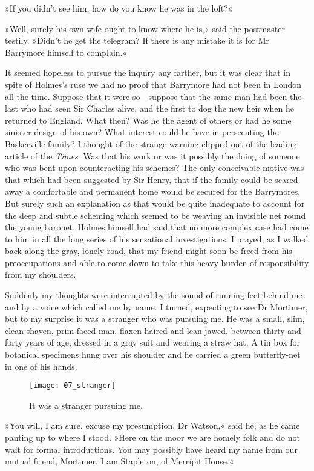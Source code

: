 »If you didn't see him, how do you know he was in the loft?«

»Well, surely his own wife ought to know where he is,« said the postmaster testily. »Didn't he get the telegram? If there is any mistake it is for Mr Barrymore himself to complain.«

It seemed hopeless to pursue the inquiry any farther, but it was clear that in spite of Holmes's ruse we had no proof that Barrymore had not been in London all the time. Suppose that it were so\allowbreak\allowbreak---\allowbreak \allowbreak suppose that the same man had been the last who had seen Sir Charles alive, and the first to dog the new heir when he returned to England. What then? Was he the agent of others or had he some sinister design of his own? What interest could he have in persecuting the Baskerville family? I thought of the strange warning clipped out of the leading article of the \textit{Times}. Was that his work or was it possibly the doing of someone who was bent upon counteracting his schemes? The only conceivable motive was that which had been suggested by Sir Henry, that if the family could be scared away a comfortable and permanent home would be secured for the Barrymores. But surely such an explanation as that would be quite inadequate to account for the deep and subtle scheming which seemed to be weaving an invisible net round the young baronet. Holmes himself had said that no more complex case had come to him in all the long series of his sensational investigations. I prayed, as I walked back along the gray, lonely road, that my friend might soon be freed from his preoccupations and able to come down to take this heavy burden of responsibility from my shoulders.

Suddenly my thoughts were interrupted by the sound of running feet behind me and by a voice which called me by name. I turned, expecting to see Dr Mortimer, but to my surprise it was a stranger who was pursuing me. He was a small, slim, clean-shaven, prim-faced man, flaxen-haired and lean-jawed, between thirty and forty years of age, dressed in a gray suit and wearing a straw hat. A tin box for botanical specimens hung over his shoulder and he carried a green butterfly-net in one of his hands.

\begin{figure}[tbhp]
\centering
\texttt{[image: 07\_stranger]}
\caption{It was a stranger pursuing me.}
\end{figure}

»You will, I am sure, excuse my presumption, Dr Watson,« said he, as he came panting up to where I stood. »Here on the moor we are homely folk and do not wait for formal introductions. You may possibly have heard my name from our mutual friend, Mortimer. I am Stapleton, of Merripit House.«

